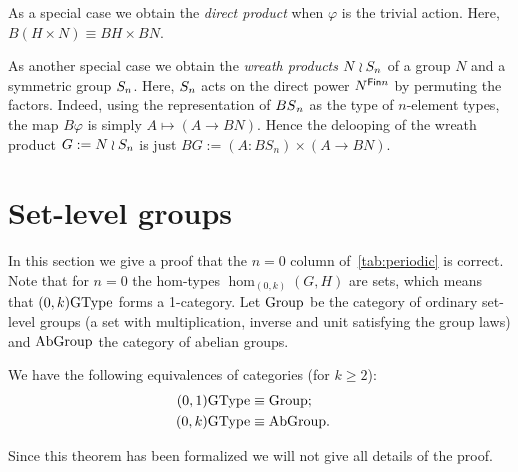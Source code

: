 As a special case we obtain the \emph{direct product} when $\varphi$
is the trivial action. Here, $B(H \times N) \equiv BH \times BN$.

As another special case we obtain the \emph{wreath products} $N \wr
S_n$ of a group $N$ and a symmetric group $S_n$. Here,
$S_n$ acts on the direct power $N^{\mathsf{Fin} n}$ by permuting the
factors. Indeed, using the representation of $\mathop{BS}_n$ as the type of
$n$-element types, the map $B\varphi$ is simply $A \mapsto (A \to
BN)$. Hence the delooping of the wreath product $G := N \wr S_n$
is just $BG:=(A:BS_n) \times (A \to BN)$.

\section{Set-level groups}
\label{sec:n=0}
In this section we give a proof that the $n=0$ column of~\autoref{tab:periodic} is correct. 
Note that for $n=0$ the hom-types $\hom_{(0,k)}(G,H)$ are sets, which means that $(0,k)\mathrm{GType}$ forms a 1-category. %
Let $\mathrm{Group}$ be the category of ordinary set-level groups (a set with multiplication, inverse and unit satisfying the group laws) and $\mathrm{AbGroup}$ the category of abelian groups.
\begin{thm}
  We have the following equivalences of categories
  {\normalfont(}\/for $k\geq2${\normalfont):}
  \begin{align*}
    (0,1)\mathrm{GType} &\equiv \mathrm{Group};&&\\
    (0,k)\mathrm{GType} &\equiv \mathrm{AbGroup}.&&
  \end{align*}
\end{thm}
Since this theorem has been formalized we will not give all details of the proof.
